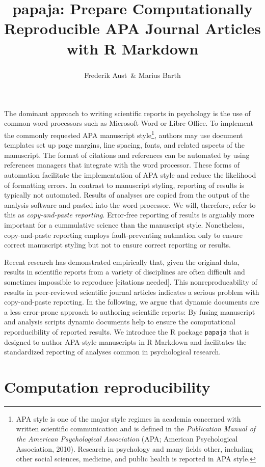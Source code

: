 \documentclass[man,floatsintext]{apa6}
\title{papaja: Prepare Computationally Reproducible APA Journal Articles with R
Markdown}
\author{Frederik Aust\textsuperscript{}~\& Marius Barth\textsuperscript{}}
\date{}
\affiliation{
\vspace{0.5cm}
\textsuperscript{} University of Cologne}
\let\rmarkdownfootnote\footnote%
\def\footnote{\protect\rmarkdownfootnote}
\theoremstyle{definition}
\theoremstyle{definition}
\theoremstyle{definition}
\theoremstyle{remark}
\begin{document}
\maketitle

The dominant approach to writing scientific reports in psychology is the
use of common word processors such as Microsoft Word or Libre Office. To
implement the commonly requested APA manuscript style\footnote{APA style
  is one of the major style regimes in academia concerned with written
  scientific communication and is defined in the \emph{Publication
  Manual of the American Psychological Association} (APA; American
  Psychological Association, 2010). Research in psychology and many
  fields other, including other social sciences, medicine, and public
  health is reported in APA style.}, authors may use document templates
set up page margins, line spacing, fonts, and related aspects of the
manuscript. The format of citations and references can be automated by
using references managers that integrate with the word processor. These
forms of automation facilitate the implementation of APA style and
reduce the likelihood of formatting errors. In contrast to manuscript
styling, reporting of results is typically not automated. Results of
analyses are copied from the output of the analysis software and pasted
into the word processor. We will, therefore, refer to this as
\emph{copy-and-paste reporting}. Error-free reporting of results is
arguably more important for a cummulative science than the manuscript
style. Nonetheless, copy-and-paste reporting employs fault-preventing
autmation only to ensure correct manuscript styling but not to ensure
correct reporting or results.

Recent research has demonstrated empirically that, given the original
data, results in scientific reports from a variety of disciplines are
often difficult and sometimes impossible to reproduce {[}citations
needed{]}. This nonreproducability of results in peer-reviewed
scientific journal articles indicates a serious problem with
copy-and-paste reporting. In the following, we argue that dynamic
documents are a less error-prone approach to authoring scientific
reports: By fusing manuscript and analysis scripts dynamic documents
help to ensure the computational reporducibility of reported results. We
introduce the R package \texttt{papaja} that is designed to author
APA-style manuscripts in R Markdown and facilitates the standardized
reporting of analyses common in psychological research.

\section{Computation reproducibility}\label{computation-reproducibility}
\end{document}
